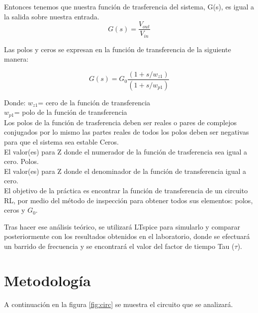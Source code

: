 \documentclass{article}
\begin{document}
	Entonces tenemos que nuestra función de trasferencia del sistema, G(s), es igual a la salida sobre nuestra entrada.
	\begin{equation}
	G(s)=\frac{V_{out}}{V_{in}}
	\end{equation}
	
	Las polos y ceros se expresan en la función de transferencia de la siguiente manera:
	
	\begin{equation}
	G(s)=G_0\frac{(1+s/w_{z1})}{(1+s/w_{p1})}
	\label{transfun}
	\end{equation}
	
	Donde:
	$ w_{z1} $= cero de la función de transferencia\\
	
	$ w_{p1} $= polo de la función de transferencia\\
	
	Los polos de la función de trasferencia deben ser reales o pares de complejos conjugados por lo mismo las partes reales de todos los polos deben ser negativas para que el sistema sea estable
	Ceros. \\
	
	El valor(es) para Z donde el numerador de la función de trasferencia sea igual a cero.
	Polos. \\
	
	El valor(es) para Z  donde el denominador de la función de transferencia igual a cero.\\
	
	
	El objetivo de la práctica es encontrar la función de transferencia de un circuito RL, por medio del método de inspección para obtener todos sus elementos: polos, ceros y $ G_0 $. 
	
	Tras hacer ese análisis teórico, se utilizará LTspice para simularlo y comparar posteriormente con los resultados obtenidos en el laboratorio, donde se efectuará un barrido de frecuencia y se encontrará el valor del factor de tiempo Tau ($ \tau $).
	
	
	\section{Metodología}
	
	A continuación en la figura \ref{fig:circ} se muestra el circuito que se analizará.
	
\end{document}
